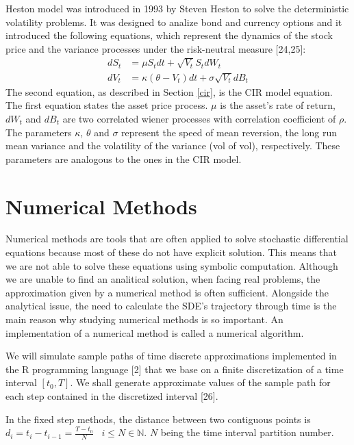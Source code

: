 \documentclass[12pt,twoside]{reedthesis}
\theoremstyle{definition}
\theoremstyle{definition}
\theoremstyle{remark}
\begin{document}
  Heston model was introduced in 1993 by Steven Heston to solve the
  deterministic volatility problems. It was designed to analize bond and
  currency options and it introduced the following equations, which
  represent the dynamics of the stock price and the variance processes
  under the risk-neutral measure {[}24,25{]}:
  \begin{align}
  \label{eq:heston}
  dS_t &= \mu S_t dt + \sqrt{V_t} S_t dW_t \\
  dV_t &=  \kappa (\theta - V_t)dt + \sigma \sqrt{V_t} dB_t
  \label{eq:hesvar}
  \end{align}
  The second equation, as described in Section \ref{cir}, is the CIR model
  equation. The first equation states the asset price process. \(\mu\) is
  the asset's rate of return, \(dW_{t}\) and \(dB_{t}\) are two correlated
  wiener processes with correlation coefficient of \(\rho\). The
  parameters \(\kappa\), \(\theta\) and \(\sigma\) represent the speed of
  mean reversion, the long run mean variance and the volatility of the
  variance (vol of vol), respectively. These parameters are analogous to
  the ones in the CIR model.
  
  \section{Numerical Methods}\label{numerical-methods}
  
  Numerical methods are tools that are often applied to solve stochastic
  differential equations because most of these do not have explicit
  solution. This means that we are not able to solve these equations using
  symbolic computation. Although we are unable to find an analitical
  solution, when facing real problems, the approximation given by a
  numerical method is often sufficient. Alongside the analytical issue,
  the need to calculate the SDE's trajectory through time is the main
  reason why studying numerical methods is so important. An implementation
  of a numerical method is called a numerical algorithm.
  
  We will simulate sample paths of time discrete approximations
  implemented in the R programming language {[}2{]} that we base on a
  finite discretization of a time interval \([t_0, T]\). We shall generate
  approximate values of the sample path for each step contained in the
  discretized interval {[}26{]}.
  
  In the fixed step methods, the distance between two contiguous points is
  \(d_i = t_i - t_{i-1} = \frac{T-t_0}{N} \;\;\; i \leq N \in \mathbb{N}\).
  \(N\) being the time interval partition number.
  
\end{document}
